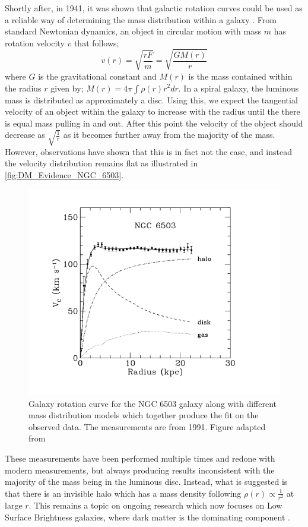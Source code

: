 \par
Shortly after, in 1941, it was shown that galactic rotation curves could be used as a reliable way of determining the mass distribution within a galaxy \cite{Chandrasekhar_1941_ref}.
From standard Newtonian dynamics, an object in circular motion with mass $m$ has rotation velocity $v$ that follows;
\begin{equation}
    v(r) = \sqrt{\frac{rF}{m}} = \sqrt{\frac{GM(r)}{r}}
    \label{eq:Kepler_Motion}
\end{equation}
where $G$ is the gravitational constant and $M(r)$ is the mass contained within the radius $r$ given by; $M(r) = 4 \pi \int \rho(r) r^{2} dr$.
In a spiral galaxy, the luminous mass is distributed as approximately a disc. 
Using this, we expect the tangential velocity of an object within the galaxy to increase with the radius until the there is equal mass pulling in and out.
After this point the velocity of the object should decrease as $\sqrt{\frac{1}{r}}$ as it becomes further away from the majority of the mass.
However, observations have shown that this is in fact not the case, and instead the velocity distribution remains flat as illustrated in \autoref{fig:DM_Evidence_NGC_6503}.
\begin{figure}[!htbp]%
    \centering
    \includegraphics[scale=1.0]{Figures/DarkMatterEvidence/NGC_6503_galaxy_speed.png}
    \caption[Galaxy rotation curve for the NGC 6503 galaxy]{Galaxy rotation curve for the NGC 6503 galaxy along with different mass distribution models which together produce the fit on the observed data. The measurements are from 1991. Figure adapted from \cite{NGC_6503_galaxy_rotation_ref}}
    \label{fig:DM_Evidence_NGC_6503}
\end{figure}
These measurements have been performed multiple times and redone with modern measurements, but always producing results inconsistent with the majority of the mass being in the luminous disc.
Instead, what is suggested is that there is an invisible halo which has a mass density following $\rho(r) \propto \frac{1}{r^2}$ at large $r$.
This remains a topic on ongoing research which now focuses on Low Surface Brightness galaxies, where dark matter is the dominating component \cite{MHONGOOSE_2018_ref}.


